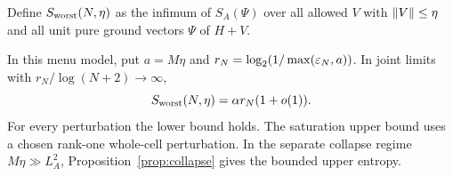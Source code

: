 Define $S_{\rm worst}(N,\eta)$ as the infimum of $S_A(\Psi)$ over
all allowed $V$ with $\lVert V\rVert\leq\eta$ and all unit pure ground
vectors $\Psi$ of $H+V$.

\begin{theorem}\label{thm:noise}
In this menu model, put $a=M\eta$ and
$r_N=\log_2(1/\max(\varepsilon_N,a))$. In joint limits with
$r_N/\log(N+2)\to\infty$,
\begin{equation}\label{eq:noise}
 S_{\rm worst}(N,\eta)=\alpha r_N(1+o(1)).
\end{equation}
For every perturbation the lower bound holds. The saturation upper
bound uses a chosen rank-one whole-cell perturbation. In the separate
collapse regime $M\eta\gg L_A^2$, Proposition~\ref{prop:collapse}
gives the bounded upper entropy.
\end{theorem}
